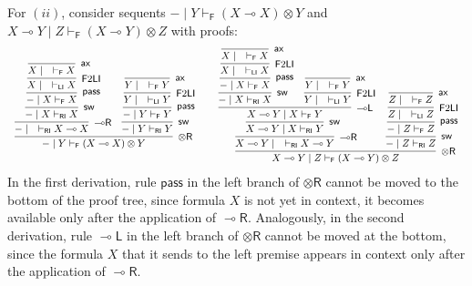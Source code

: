\documentclass[submission,copyright,creativecommons]{eptcs}
\theoremstyle{definition}
\newcommand{\tr}{\otimes \mathsf{R}}
\newcommand{\lright}{{\multimap}\mathsf{R}}
\newcommand{\lleft}{{\multimap}\mathsf{L}}
\newcommand{\pass}{\mathsf{pass}}
\newcommand{\ax}{\mathsf{ax}}
\newcommand{\ot}{\otimes}
\newcommand{\lolli}{\multimap}
\newcommand{\RI}{\mathsf{RI}}
\newcommand{\LI}{\mathsf{LI}}
\newcommand{\F}{\mathsf{F}}
\newcommand{\proofbox}[1]{\begin{tabular}{l} #1 \end{tabular}}
\newcommand{\SkNMILLA}{$\mathtt{SkNMILLA}$}
\begin{document}
For $(ii)$, consider sequents ${-} \mid Y \vdash_{\F} (X \lolli X) \ot Y$ and $X \lolli Y \mid Z \vdash_{\F} (X \lolli Y) \ot Z$ with proofs:
\begin{equation}\label{eq:counterexample1}
  \small
    \proofbox{
       \infer[\tr]{{-} \mid Y \vdash_{\F} (X \lolli X) \ot Y}{
      \infer[\lright]{{-} \mid \quad \vdash_{\RI} X \lolli X}{
        \infer[\mathsf{sw}]{{-} \mid X \vdash_{\RI} X}{
          \infer[\pass]{{-} \mid X \vdash_{\F} X}{
            \infer[\F 2 \LI]{X \mid \quad \vdash_{\LI} X}{
              \infer[\ax]{X \mid \quad \vdash_{\F} X}{}
            }
          }
        }
      }
      &
      \infer[\mathsf{sw}]{{-} \mid Y \vdash_{\RI} Y}{
        \infer[\pass]{{-} \mid Y \vdash_{\F} Y}{
          \infer[\F 2 \LI]{Y \mid \quad \vdash_{\LI} Y}{
            \infer[\ax]{Y \mid \quad \vdash_{\F} Y}{}
          }
        }
      }
       }
       }
  \quad
  \proofbox{
     \infer[\tr]{X \lolli Y \mid Z \vdash_{\F} (X \lolli Y) \ot Z}{
      \infer[\lright]{X \lolli Y \mid \quad \vdash_{\RI} X \lolli Y}{
        \infer[\mathsf{sw}]{X \lolli Y \mid X \vdash_{\RI} Y}{
          \infer[\lleft]{X \lolli Y \mid X \vdash_{\F} Y}{
            \infer[\mathsf{sw}]{{-} \mid X \vdash_{\RI} X}{
              \infer[\pass]{{-} \mid X \vdash_{\F} X}{
                \infer[\F 2 \LI]{X \mid \quad \vdash_{\LI} X}{
                  \infer[\ax]{X \mid \quad \vdash_{\F} X}{}
                }
              }
            }
            &
            \infer[\F 2 \LI]{Y \mid \quad \vdash_{\LI} Y}{
              \infer[\ax]{Y \mid \quad \vdash_{\F} Y}{}
            }
          }
        }
      }
      &
      \infer[\mathsf{sw}]{{-} \mid Z \vdash_{\RI} Z}{
        \infer[\pass]{{-} \mid Z \vdash_{\F} Z}{
          \infer[\F 2 \LI]{Z \mid \quad \vdash_{\LI} Z}{
            \infer[\ax]{Z \mid \quad \vdash_{\F} Z}{}
          }
        }
      }
     }
     }
\end{equation}
In the first derivation, rule $\pass$ in the left branch of $\tr$ cannot be moved to the bottom of the proof tree, since formula $X$ is not yet in context, it becomes available only after the application of $\lright$. Analogously, in the second derivation, rule $\lleft$ in the left branch of $\tr$ cannot be moved at the bottom, since the formula $X$ that it sends to the left premise appears in context only after the application of $\lright$.

\end{document}
